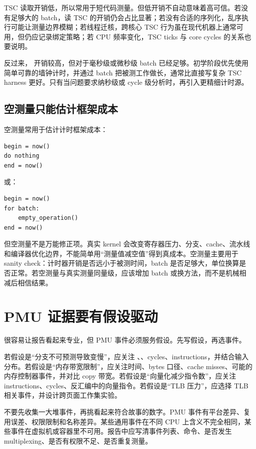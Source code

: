 TSC 读取开销低，所以常用于短代码测量。但低开销不自动意味着高可信。若没有足够大的 batch，读 TSC 的开销仍会占比显著；若没有合适的序列化，乱序执行可能让测量边界模糊；若线程迁核，跨核心 TSC 行为虽在现代机器上通常可用，但仍应记录绑定策略；若 CPU 频率变化，TSC ticks 与 core cycles 的关系也要说明。

反过来， 开销较高，但对于毫秒级或微秒级 batch 已经足够。初学阶段优先使用简单可靠的墙钟计时，并通过 batch 把被测工作做长，通常比直接写复杂 TSC harness 更好。只有当问题要求纳秒级或 cycle 级分析时，再引入更精细计时源。

\subsection{空测量只能估计框架成本}

空测量常用于估计计时框架成本：

\begin{lstlisting}
begin = now()
do nothing
end = now()
\end{lstlisting}

或：

\begin{lstlisting}
begin = now()
for batch:
    empty_operation()
end = now()
\end{lstlisting}

但空测量不是万能修正项。真实 kernel 会改变寄存器压力、分支、cache、流水线和编译器优化边界，不能简单用“测量值减空值”得到真成本。空测量主要用于 sanity check：计时器开销是否远小于被测时间，batch 是否足够大，单位换算是否正常。若空测量与真实测量同量级，应该增加 batch 或换方法，而不是机械相减后相信结果。

\section{PMU 证据要有假设驱动}

 很容易让报告看起来专业，但 PMU 事件必须服务假设。先写假设，再选事件。

若假设是“分支不可预测导致变慢”，应关注 、、cycles、instructions，并结合输入分布。若假设是“内存带宽限制”，应关注时间、bytes 口径、cache misses、可能的内存控制器事件，并对比 copy 带宽。若假设是“向量化减少指令数”，应关注 instructions、cycles、反汇编中的向量指令。若假设是“TLB 压力”，应选择 TLB 相关事件，并设计跨页面工作集实验。

不要先收集一大堆事件，再挑看起来符合故事的数字。PMU 事件有平台差异、复用误差、权限限制和名称差异。某些通用事件在不同 CPU 上含义不完全相同，某些事件在虚拟机或容器里不可用。报告中应写清事件列表、命令、是否发生 multiplexing、是否有权限不足、是否重复测量。

